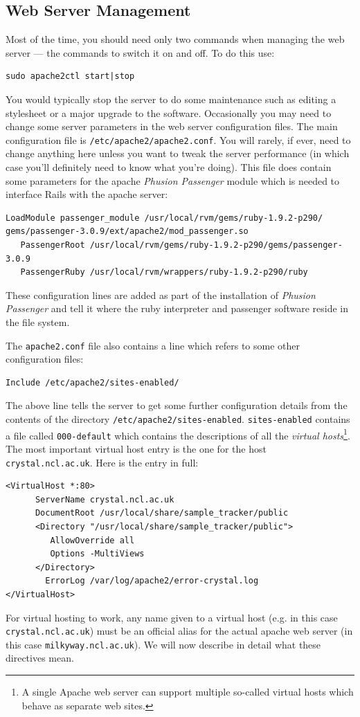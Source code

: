 \documentclass[12pt,twoside]{article}
\begin{document}
\subsection{Web Server Management}
Most of the time, you should need only
two commands when managing the web server --- the commands to switch it on
and off. To do this use:
\begin{verbatim}
sudo apache2ctl start|stop
\end{verbatim}
You would typically stop the server to do some maintenance such as editing
a stylesheet or a major upgrade to the software.
Occasionally you may need to change some server parameters in the
web server configuration files. The main configuration file is
\verb=/etc/apache2/apache2.conf=. You will rarely, if ever, need to
change anything here unless you want to tweak the server performance (in
which case you'll definitely need to know what you're doing). This file
does contain some parameters for the apache \emph{Phusion Passenger} 
module which is needed to interface Rails with the apache server:
\begin{verbatim}
LoadModule passenger_module /usr/local/rvm/gems/ruby-1.9.2-p290/
gems/passenger-3.0.9/ext/apache2/mod_passenger.so
   PassengerRoot /usr/local/rvm/gems/ruby-1.9.2-p290/gems/passenger-3.0.9
   PassengerRuby /usr/local/rvm/wrappers/ruby-1.9.2-p290/ruby
\end{verbatim}
These configuration lines are added as part of the installation of
\emph{Phusion Passenger} and tell it where the ruby interpreter and
passenger software reside in the file system.

The \verb=apache2.conf= file also contains a line which refers to some other
configuration files:
\begin{verbatim}
Include /etc/apache2/sites-enabled/
\end{verbatim}
The above line tells the server to get some further configuration
details from the contents of the directory
\verb=/etc/apache2/sites-enabled=.
\verb=sites-enabled= contains a file called \verb=000-default= which contains
the descriptions of all the \emph{virtual hosts}\footnote{A single Apache
web server can support multiple so-called virtual hosts which behave as
separate web sites.}. The most important virtual host entry is the one
for the host \verb=crystal.ncl.ac.uk=. Here is the entry in full:
\begin{verbatim}
<VirtualHost *:80>
      ServerName crystal.ncl.ac.uk
      DocumentRoot /usr/local/share/sample_tracker/public
      <Directory "/usr/local/share/sample_tracker/public">
         AllowOverride all
         Options -MultiViews
      </Directory>
        ErrorLog /var/log/apache2/error-crystal.log
</VirtualHost>
\end{verbatim}
For virtual hosting to work, any name given to a virtual host
(e.g. in this case \verb=crystal.ncl.ac.uk=) must be an official alias
for the actual apache web server (in this case \verb=milkyway.ncl.ac.uk=).
We will now describe in detail what these directives mean.
\end{document}
